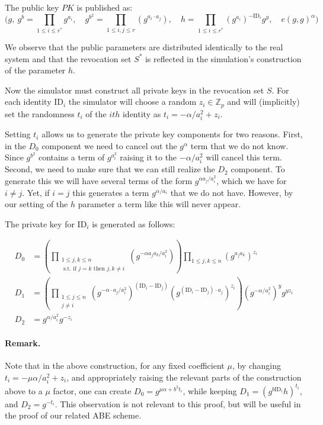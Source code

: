 \documentclass[a4paper, 11pt]{article}
\newcommand{\Z}{\ensuremath{\mathbb{Z}}}
\theoremstyle{definition}
\newcommand{\ID}{\ensuremath{\textrm{ID}}}
\begin{document}
The public key $PK$ is published as:
\[ \big(
    g, \
    g^{b}=\prod_{1 \leq i \leq r^*} g^{a_i}, \quad
    g^{b^2}=\prod_{1 \leq i,j \leq r} (g^{a_i \cdot a_j})
    , \quad
    h= \prod_{1 \leq i \leq r^*} (g^{a_i})^{-\ID_i}g^y, \quad
    e(g,g)^{\alpha}
\big)
\]

We observe that the public parameters are distributed identically to the
real system and that the revocation set $S^*$ is reflected in the
simulation's construction of the parameter $h$.

Now the simulator must construct all private keys in the revocation
set $S$. For each identity $\ID_i$ the simulator will choose a random
$z_i \in \Z_p$ and will (implicitly) set the randomness $t_i$ of the
$ith$ identity as $t_i= - \alpha / a_i^2 +z_i$.

Setting $t_i$ allows us to generate the private key components for two
reasons. First, in the $D_0$ component we need to cancel out the
$g^{\alpha}$ term that we do not know. Since $g^{b^2}$ contains a term
of $g^{a_i^2}$ raising it to the $-\alpha/a_i^2$ will cancel this term.
Second, we need to make sure that we can still realize the $D_2$ component.
To generate this we will have several terms of the form $g^{\alpha a_j/a_i^2}$, which
we have for $i \neq j$. Yet, if $i=j$ this generates a term $g^{\alpha / a_i}$ that
we do not have. However, by our setting of the $h$ parameter a term like this will
never appear.

The private key for $\ID_i$ is generated as follows:


\begin{align*}
D_0 &=  \left( \prod_{\substack{1 \leq j,k \leq n \\  \textrm{~s.t.~if~}  j=k \textrm{~then~} j,k \neq i}}
           (g^{ -\alpha a_j a_k / a_i^2})
\right) \prod_{1 \leq j,k \leq n} (g^{a_j a_k})^{z_i}
\\
D_1 &=  \left(
\prod_{\substack{1 \leq j \leq n \\ j \neq i}}
( g^{-\alpha \cdot a_j/a_i^2})^{(\ID_i-\ID_j)} (g^{(\ID_i-\ID_j) \cdot a_j})^{z_i}
\right )
(g^{-\alpha/a_i^2})^{y} g^{y z_i}
\\
D_2 &=  g^{\alpha/ a_i^2} g^{-z_i}
\end{align*}

\paragraph{Remark.}  Note that in the above construction, for any fixed coefficient $\mu$, by changing $t_i= - \mu \alpha / a_i^2 +z_i$, and appropriately raising the relevant parts of the construction above to a $\mu$ factor, one can create $D_0 = g^{\mu \alpha + b^2 t_i}$, while keeping $D_1 = (g^{b \ID_i}h)^{t_i}$, and $D_2 = g^{-t_i}$.  This observation is not relevant to this proof, but will be useful in the proof of our related ABE scheme.
\end{document}
